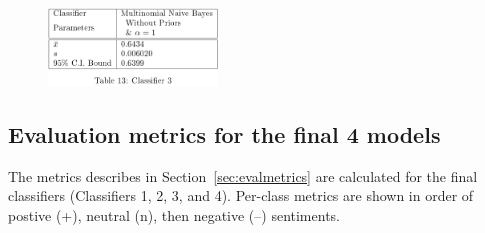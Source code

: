 \documentclass[11pt]{article}
\begin{document}

\begin{figure}[H]
	\centering
	\includegraphics[width = 0.4\textwidth]{c3s.png}
	\label{tbl:3rd10000}
\end{figure} 

\subsection{Evaluation metrics for the final 4 models}\label{sec:4metrics}

The metrics describes in Section~\ref{sec:evalmetrics} are calculated for the final classifiers (Classifiers 1, 2, 3, and 4). 
Per-class metrics are shown in order of postive (+), neutral (n), then negative (--) sentiments.

\end{document}
